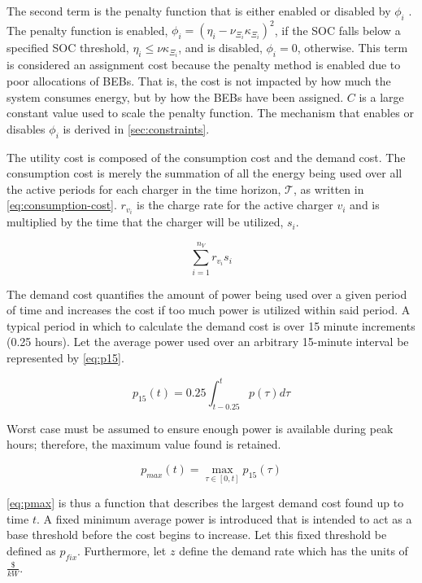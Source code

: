 \documentclass[11pt,a4paper,final]{article}
\newcommand{\T}{\mathcal{T}}                %
\begin{document}
The second term is the penalty function that is either enabled or disabled by \(\phi_i\)
\cite{luenberger-2008-penal-barrier-method}. The penalty function is enabled, \(\phi_i = (\eta_i - \nu_{\Xi_i} \kappa_{\Xi_i})^2\), if the
SOC falls below a specified SOC threshold, \(\eta_i \le \nu \kappa_{\Xi_i}\), and is disabled, \(\phi_i = 0\), otherwise. This term is
considered an assignment cost because the penalty method is enabled due to poor allocations of BEBs. That is, the cost
is not impacted by how much the system consumes energy, but by how the BEBs have been assigned. \(C\) is a large constant
value used to scale the penalty function. The mechanism that enables or disables \(\phi_i\) is derived in \ref{sec:constraints}.

The utility cost is composed of the consumption cost and the demand cost. The consumption cost is merely the summation
of all the energy being used over all the active periods for each charger in the time horizon, \(\T\), as written in
\ref{eq:consumption-cost}. \(r_{v_i}\) is the charge rate for the active charger \(v_i\) and is multiplied by the time that the
charger will be utilized, \(s_i\).

\begin{equation}
\label{eq:consumption-cost}
  \sum_{i=1}^{n_V} r_{v_i}s_i
\end{equation}

The demand cost quantifies the amount of power being used over a given period of time and increases the cost if too much
power is utilized within said period. A typical period in which to calculate the demand cost is over 15 minute
increments (0.25 hours). Let the average power used over an arbitrary 15-minute interval be represented by \ref{eq:p15}.

\begin{equation}
\label{eq:p15}
p_{15}(t) = 0.25 \int_{t-0.25}^{t} p(\tau) d\tau
\end{equation}

Worst case must be assumed to ensure enough power is available during peak hours; therefore, the maximum value found is
retained.

\begin{equation}
\label{eq:pmax}
p_{max}(t) = \max\limits_{\tau \in [0,t]}p_{15}(\tau)
\end{equation}

\ref{eq:pmax} is thus a function that describes the largest demand cost found up to time \(t\). A fixed minimum average power is
introduced that is intended to act as a base threshold before the cost begins to increase. Let this fixed threshold be
defined as \(p_{fix}\). Furthermore, let \(z\) define the demand rate which has the units of \(\frac{\$}{kW}\).
\end{document}
